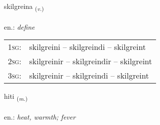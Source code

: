\documentclass[frontgrid, backgrid]{flacards}\usepackage[]{graphicx}\usepackage[]{xcolor}
\begin{document}
\renewcommand{\flhead}{\vskip5pt \fboxsep=0pt {\small\bfseries\footnotesize Sagnorð | Verb}}
\renewcommand{\fcfoot}{\vskip5pt \fboxsep=0pt \hspace{2pt}{\small\bfseries\footnotesize 1K}}

\renewcommand{\blhead}{\vskip5pt {\small\bfseries\footnotesize Sagnorð | Verb }}
\renewcommand{\bcfoot}{\vskip5pt \hspace{2pt}{\small\bfseries\footnotesize 1K}}


{skilgreina \small{\textsubscript{(\textit{v.})}} \\[1ex] %
\textphonetic{[scɪlkreina]} \\
en.: \emph{define} \\  [2ex]
\renewcommand*{\arraystretch}{0.8}
\begin{tabular}{p{1cm}l}
\textsc{1sg}: & skilgreini -- skilgreindi -- skilgreint \\ 
\textsc{2sg}: & skilgreinir -- skilgreindir -- skilgreint \\ 
\textsc{3sg}: & skilgreinir -- skilgreindi -- skilgreint \\ 
\end{tabular}
}

\renewcommand{\flhead}{\vskip5pt \fboxsep=0pt {\small\bfseries\footnotesize Nafnorð | Noun}}
\renewcommand{\fcfoot}{\vskip5pt \fboxsep=0pt \hspace{2pt}{\small\bfseries\footnotesize 1K}}

\renewcommand{\blhead}{\vskip5pt {\small\bfseries\footnotesize Nafnorð | Noun }}
\renewcommand{\bcfoot}{\vskip5pt \hspace{2pt}{\small\bfseries\footnotesize 1K}}


{hiti \small{\textsubscript{(\textit{m.})}} \\[1ex] %
\textphonetic{[hɪːtɪ]} \\
en.: \emph{heat, warmth; fever} \\  [2ex]
\renewcommand*{\arraystretch}{0.8}
}
\end{document}
